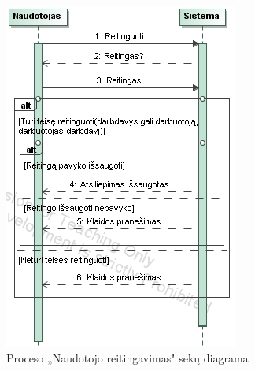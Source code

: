 \documentclass{VUMIFPSkursinis}
\begin{document}
\begin{figure}[H]
\centering
\includegraphics[scale=1, frame]{img/reitingavimas.png}
\caption{Proceso „Naudotojo reitingavimas" sekų diagrama}
\end{figure}
\end{document}
